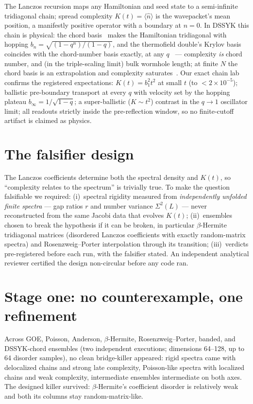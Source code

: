 \documentclass[11pt]{article}
\newcommand{\Svar}{\Sigma^2}
\begin{document}
The Lanczos recursion maps any Hamiltonian and seed state to a semi-infinite
tridiagonal chain; spread complexity $K(t)=\langle \hat n\rangle$ is the
wavepacket's mean position, a manifestly positive operator with a boundary at
$n=0$. In DSSYK this chain is physical: the chord
basis~\cite{lin,berkooz} makes the Hamiltonian tridiagonal with hopping
$b_n=\sqrt{(1-q^n)/(1-q)}$, and the thermofield double's Krylov basis
coincides with the chord-number basis exactly, at any $q$~\cite{rsss} ---
complexity \emph{is} chord number, and (in the triple-scaling limit) bulk
wormhole length; at finite $N$ the chord basis is an extrapolation and
complexity saturates~\cite{bmnw}. Our exact chain lab confirms the registered
expectations: $K(t)=b_1^2t^2$ at small $t$ (to $<2\times10^{-5}$); ballistic
pre-boundary transport at every $q$ with velocity set by the hopping plateau
$b_\infty=1/\sqrt{1-q}$; a super-ballistic ($K\!\sim\!t^2$) contrast in the
$q\to1$ oscillator limit; all readouts strictly inside the pre-reflection
window, so no finite-cutoff artifact is claimed as physics.

\section{The falsifier design}

The Lanczos coefficients determine both the spectral density and $K(t)$, so
``complexity relates to the spectrum'' is trivially true. To make the question
falsifiable we required: (i)~spectral rigidity measured from
\emph{independently unfolded finite spectra} --- gap ratios $r$ and number
variance $\Svar(L)$ --- never reconstructed from the same Jacobi data that
evolves $K(t)$; (ii)~ensembles chosen to break the hypothesis if it can be
broken, in particular $\beta$-Hermite tridiagonal matrices (disordered Lanczos
coefficients with exactly random-matrix spectra) and Rosenzweig--Porter
interpolation through its transition; (iii)~verdicts pre-registered before
each run, with the falsifier stated. An independent analytical reviewer
certified the design non-circular before any code ran.

\section{Stage one: no counterexample, one refinement}

Across GOE, Poisson, Anderson, $\beta$-Hermite, Rosenzweig--Porter, banded,
and DSSYK-chord ensembles (two independent executions; dimensions 64--128, up
to 64 disorder samples), no clean bridge-killer appeared: rigid spectra came
with delocalized chains and strong late complexity, Poisson-like spectra with
localized chains and weak complexity, intermediate ensembles intermediate on
both axes. The designed killer survived: $\beta$-Hermite's coefficient
disorder is relatively weak and both its columns stay random-matrix-like.
\end{document}
